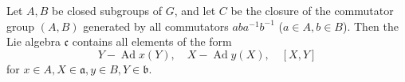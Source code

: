 Let $A, B$ be closed subgroups of $G$, and let $C$ be the closure of the commutator group $(A, B)$ generated by all commutators $aba^{-1}b^{-1}$ ($a \in A, b \in B$). Then the Lie algebra $\mathfrak{c}$ contains all elements of the form
$$Y - \operatorname{Ad} x(Y), \quad X - \operatorname{Ad} y(X), \quad [X, Y]$$
for $x \in A, X \in \mathfrak{a}, y \in B, Y \in \mathfrak{b}$.
